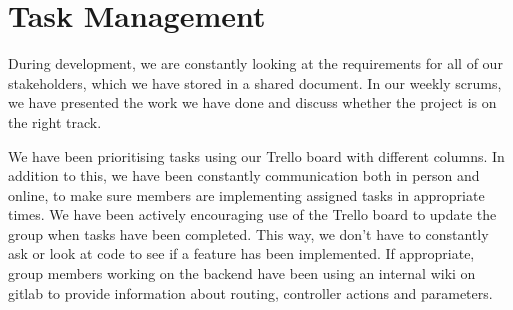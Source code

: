 \documentclass[a4paper]{article}
\begin{document}
\section{Task Management}



During development, we are constantly looking at the requirements for 
all of our stakeholders, which 
we have stored in a shared document. In our weekly scrums, we have 
presented the work we have done and discuss whether the project is on the 
right track.



We have been prioritising tasks using our Trello board with different
columns. In addition to this, we have been constantly communication both 
in person and online, to make sure members are implementing assigned tasks
in appropriate times. We have been actively encouraging use of the Trello 
board to update the group when tasks have been completed. This way, 
we don't have to constantly ask or look at code to see if a feature has 
been implemented. If appropriate, group members working on the backend
have been using an internal wiki on gitlab to provide information about
routing, controller actions and parameters. 
\end{document}
